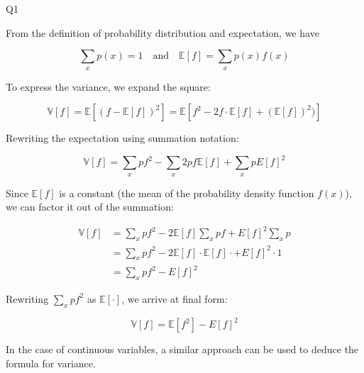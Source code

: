 \question Q1\droppoints

\begin{solution}
    From the definition of probability distribution and expectation, we have

    \[
        \sum_{x}{p(x)} = 1 \quad \text{and} \quad \mathbb{E}[f] = \sum_{x}{p(x)f(x)}
    \]

    To express the variance, we expand the square:

    \[
        \mathbb{V}[f]
        = \mathbb{E}[(f - \mathbb{E}[f])^2]
        = \mathbb{E}[f^2 - 2f \cdot \mathbb{E}[f] + (\mathbb{E}[f])^2)]
    \]

    Rewriting the expectation using summation notation:

    \[
        \mathbb{V}[f]
        = \sum_{x}{pf^2} - \sum_{x}{2pf\mathbb{E}[f]} + \sum_{x}{pE[f]^2}
    \]

    Since $\mathbb{E}[f]$ is a constant (the mean of the probability density function $f(x)$), we can factor it out of the summation:

    \begin{align*}
        \mathbb{V}[f]
        &= \sum_{x}{pf^2} - 2\mathbb{E}[f]\sum_{x}{pf} + E[f]^2\sum_{x}{p} \\
        &= \sum_{x}{pf^2} - 2\mathbb{E}[f] \cdot \mathbb{E}[f] \cdot + E[f]^2 \cdot 1 \\
        &= \sum_{x}{pf^2} - E[f]^2
    \end{align*}

    Rewriting $\sum_{x}{pf^2}$ as $\mathbb{E}[\cdot]$, we arrive at final form:

    \[
        \mathbb{V}[f] = \mathbb{E}[f^2] - E[f]^2
    \]

    In the case of continuous variables, a similar approach can be used to deduce the formula for variance.
\end{solution}
